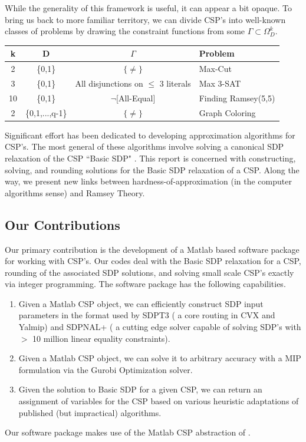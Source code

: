 \documentclass[12pt]{article} %
\begin{document}
While the generality of this framework is useful, it can appear a bit opaque. To bring us back to more familiar territory, we can divide CSP's into well-known classes of problems by drawing the constraint functions from some $\Gamma \subset \Omega_D^k$.

\begin{center}
\begin{tabular}{c c c l}
\hline
k & D & $\Gamma$ & Problem \\
\hline
2  & \{0,1\} & $\{\neq\}$ & Max-Cut \\
3  & \{0,1\} & All disjunctions on $\leq $ 3 literals & Max 3-SAT \\
10 & \{0,1\} & $\neg$[All-Equal] & Finding Ramsey(5,5) \\
2  & \{0,1,...,q-1\} & $\{\neq\}$ & Graph Coloring \\
\hline
\end{tabular}
\end{center}

Significant effort has been dedicated to developing approximation algorithms for CSP's. The most general of these algorithms involve solving a canonical SDP relaxation of the CSP ``Basic SDP" \cite{raghavendra2008optimal}. This report is concerned with constructing, solving, and rounding solutions for the Basic SDP relaxation of a CSP. Along the way, we present new links between hardness-of-approximation (in the computer algorithms sense) and Ramsey Theory.


\subsection{Our Contributions}
 
Our primary contribution is the development of a Matlab based software package for working with CSP's. Our codes deal with the Basic SDP relaxation for a CSP, rounding of the associated SDP solutions, and solving small scale CSP's exactly via integer programming. The software package has the following capabilities.

\begin{enumerate}
\item Given a Matlab CSP object, we can efficiently construct SDP input parameters in the format used by SDPT3 ( a core routing in CVX and Yalmip) and SDPNAL+ ( a cutting edge solver capable of solving SDP's with $>$ 10 million linear equality constraints).

\item Given a Matlab CSP object, we can solve it to arbitrary accuracy with a MIP formulation via the Gurobi Optimization solver.

\item Given the solution to Basic SDP for a given CSP, we can return an assignment of variables for the CSP based on various heuristic adaptations of published (but impractical) algorithms.
\end{enumerate}
Our software package makes use of the Matlab CSP abstraction of \cite{dwivedi2015introduction}.
\end{document}
